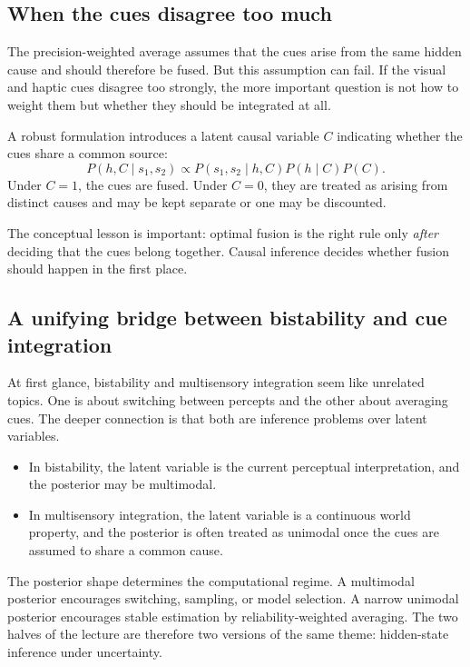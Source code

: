 \subsection{When the cues disagree too much}

The precision-weighted average assumes that the cues arise from the same hidden cause and should therefore be fused. But this assumption can fail. If the visual and haptic cues disagree too strongly, the more important question is not how to weight them but whether they should be integrated at all.

A robust formulation introduces a latent causal variable \(C\) indicating whether the cues share a common source:
\[
P(h,C\mid s_1,s_2) \propto P(s_1,s_2\mid h,C)P(h\mid C)P(C).
\]
Under \(C=1\), the cues are fused. Under \(C=0\), they are treated as arising from distinct causes and may be kept separate or one may be discounted.

The conceptual lesson is important: optimal fusion is the right rule only \emph{after} deciding that the cues belong together. Causal inference decides whether fusion should happen in the first place.

\subsection{A unifying bridge between bistability and cue integration}

At first glance, bistability and multisensory integration seem like unrelated topics. One is about switching between percepts and the other about averaging cues. The deeper connection is that both are inference problems over latent variables.

\begin{itemize}
    \item In bistability, the latent variable is the current perceptual interpretation, and the posterior may be multimodal.
    \item In multisensory integration, the latent variable is a continuous world property, and the posterior is often treated as unimodal once the cues are assumed to share a common cause.
\end{itemize}

The posterior shape determines the computational regime. A multimodal posterior encourages switching, sampling, or model selection. A narrow unimodal posterior encourages stable estimation by reliability-weighted averaging. The two halves of the lecture are therefore two versions of the same theme: hidden-state inference under uncertainty.

